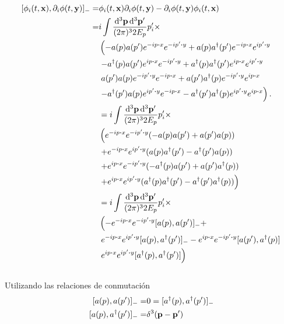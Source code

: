 \documentclass{article}
\begin{document}
\begin{align}
\begin{split}
[\phi_i(t,\vb{x}),\partial_i\phi(t,\vb{y})]_-=&\phi_i(t,\vb{x})\partial_i\phi(t,\vb{y})-\partial_i\phi(t,\vb{y})\phi_i(t,\vb{x})\\
=&i\int\frac{\dd[3]{\vb{p}}\dd[3]{\vb{p'}}}{(2\pi)^32E_p}p_i'\times\\
&\left(-a(p)a(p')e^{-ip\vdot x}e^{-ip'\vdot y}+a(p)a^\dagger(p')e^{-ip\vdot x}e^{ip'\vdot y}\right.\\
&\left.-a^\dagger(p)a(p')e^{ip\vdot x}e^{-ip'\vdot y}+a^\dagger(p)a^\dagger(p')e^{ip\vdot x}e^{ip'\vdot y}\right.\\
&\left.a(p')a(p)e^{-ip'\vdot y}e^{-ip\vdot x}+a(p')a^\dagger(p)e^{-ip'\vdot y}e^{ip\vdot x}\right.\\
&\left.-a^\dagger(p')a(p)e^{ip'\vdot y}e^{-ip\vdot x}-a^\dagger(p')a^\dagger(p)e^{ip'\vdot y}e^{ip\vdot x}\right).\\
&=i\int\frac{\dd[3]{\vb{p}}\dd[3]{\vb{p'}}}{(2\pi)^32E_p}p_i'\times\\
&\left(e^{-ip\vdot x}e^{-ip'\vdot y}(-a(p)a(p')+a(p')a(p))\right.\\
&\left.+e^{-ip\vdot x}e^{ip'\vdot y}(a(p)a^\dagger(p')-a^\dagger(p')a(p))\right.\\
&\left.+e^{ip\vdot x}e^{-ip'\vdot y}(-a^\dagger(p)a(p')+a(p')a^\dagger(p))\right.\\
&\left.+e^{ip\vdot x}e^{ip'\vdot y}(a^\dagger(p)a^\dagger(p')-a^\dagger(p')a^\dagger(p))\right)\\
&=i\int\frac{\dd[3]{\vb{p}}\dd[3]{\vb{p'}}}{(2\pi)^32E_p}p_i'\times\\
&\left(-e^{-ip\vdot x}e^{-ip'\vdot y}[a(p),a(p')]_-+\right.\\
&\left.e^{-ip\vdot x}e^{ip'\vdot y}[a(p),a^\dagger(p')]_--e^{ip\vdot x}e^{-ip'\vdot y}[a(p'),a^\dagger(p)]\right.\\
&\left.e^{ip\vdot x}e^{ip'\vdot y}[a^\dagger(p),a^\dagger(p')]\right)\\
\end{split}
\end{align}\\
Utilizando las relaciones de conmutación
\begin{align}
\begin{split}
[a(p),a(p')]_-=&0=[a^\dagger(p),a^\dagger(p')]_-\\
[a(p),a^\dagger(p')]_-=&\delta^{3}(\vb{p}-\vb{p}')
\end{split}
\end{align}
\end{document}
